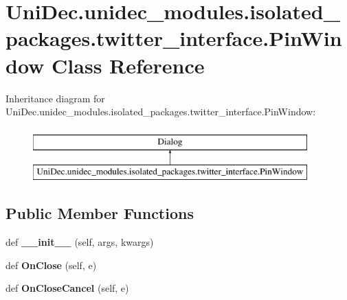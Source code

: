 \hypertarget{class_uni_dec_1_1unidec__modules_1_1isolated__packages_1_1twitter__interface_1_1_pin_window}{}\section{Uni\+Dec.\+unidec\+\_\+modules.\+isolated\+\_\+packages.\+twitter\+\_\+interface.\+Pin\+Window Class Reference}
\label{class_uni_dec_1_1unidec__modules_1_1isolated__packages_1_1twitter__interface_1_1_pin_window}
Inheritance diagram for Uni\+Dec.\+unidec\+\_\+modules.\+isolated\+\_\+packages.\+twitter\+\_\+interface.\+Pin\+Window\+:\begin{figure}[H]
\begin{center}
\leavevmode
\includegraphics[height=2.000000cm]{class_uni_dec_1_1unidec__modules_1_1isolated__packages_1_1twitter__interface_1_1_pin_window}
\end{center}
\end{figure}
\subsection*{Public Member Functions}
\begin{DoxyCompactItemize}
\item 
\hypertarget{class_uni_dec_1_1unidec__modules_1_1isolated__packages_1_1twitter__interface_1_1_pin_window_a3751d5327fe018d8acf10966eee6e122}{}def {\bfseries \+\_\+\+\_\+init\+\_\+\+\_\+} (self, args, kwargs)\label{class_uni_dec_1_1unidec__modules_1_1isolated__packages_1_1twitter__interface_1_1_pin_window_a3751d5327fe018d8acf10966eee6e122}

\item 
\hypertarget{class_uni_dec_1_1unidec__modules_1_1isolated__packages_1_1twitter__interface_1_1_pin_window_ae5dd6f0761d8acfdaa69b74ac3038a13}{}def {\bfseries On\+Close} (self, e)\label{class_uni_dec_1_1unidec__modules_1_1isolated__packages_1_1twitter__interface_1_1_pin_window_ae5dd6f0761d8acfdaa69b74ac3038a13}

\item 
\hypertarget{class_uni_dec_1_1unidec__modules_1_1isolated__packages_1_1twitter__interface_1_1_pin_window_a9a77fec931cf3339267b98776900c032}{}def {\bfseries On\+Close\+Cancel} (self, e)\label{class_uni_dec_1_1unidec__modules_1_1isolated__packages_1_1twitter__interface_1_1_pin_window_a9a77fec931cf3339267b98776900c032}

\end{DoxyCompactItemize}
